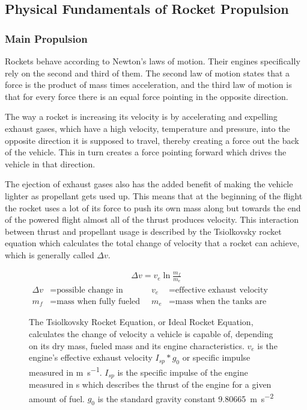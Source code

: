 \subsection{Physical Fundamentals of Rocket Propulsion}
\subsubsection{Main Propulsion}
Rockets behave according to Newton's laws of motion. Their engines specifically rely on the second and third of them. The second law of motion states that a force is the product of mass times acceleration, and the third law of motion is that for every force there is an equal force pointing in the opposite direction. 

The way a rocket is increasing its velocity is by accelerating and expelling exhaust gases, which have a high velocity, temperature and pressure, into the opposite direction it is supposed to travel, thereby creating a force out the back of the vehicle. This in turn creates a force pointing forward which drives the vehicle in that direction.

The ejection of exhaust gases also has the added benefit of making the vehicle lighter as propellant gets used up. This means that at the beginning of the flight the rocket uses a lot of its force to push its own mass along but towards the end of the powered flight almost all of the thrust produces velocity.
This interaction between thrust and propellant usage is described by the Tsiolkovsky rocket equation which calculates the total change of velocity that a rocket can achieve, which is generally called $\Delta v$.

\begin{figure}[H]
\begin{align*}
\Delta v=v_{e}\ln {\frac {m_{f}}{m_{e}}}
\end{align*}
\begin{align*}
\Delta v &= \text{possible change in velocity} & v_{e} &= \text{effective exhaust velocity} \\
m_{f} &= \text{mass when fully fueled} & m_{e} &= \text{mass when the tanks are empty}
\end{align*}
\caption{The Tsiolkovsky Rocket Equation, or Ideal Rocket Equation, calculates the change of velocity a vehicle is capable of, depending on its dry mass, fueled mass and its engine characteristics. $v_{e}$ is the engine's effective exhaust velocity $I_{sp}*g_{0}$ or specific impulse measured in \si{\meter\per\second}. $I_{sp}$ is the specific impulse of the engine measured in \si{\second} which describes the thrust of the engine for a given amount of fuel. $g_{0}$ is the standard gravity constant \SI{9.80665}{\meter\per\second\squared}}
\end{figure}

